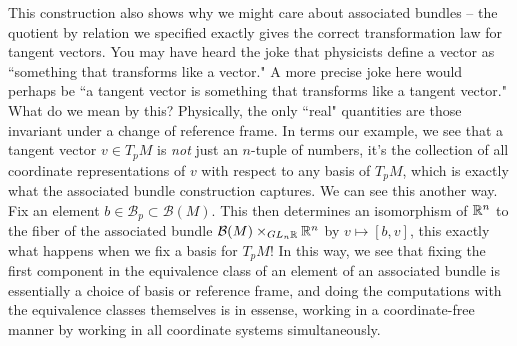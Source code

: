 \documentclass[abstract=on,twoside]{scrreprt}
\begin{document}
This construction also shows why we might care about associated bundles -- the quotient
by relation we specified exactly gives the correct transformation law for tangent
vectors. You may have heard the joke that physicists define a vector as ``something
that transforms like a vector." A more precise joke here would perhaps be ``a tangent
vector is something that transforms like a tangent vector." What do we mean by this?
Physically, the only ``real" quantities are those invariant under a change of reference
frame. In terms our example, we see that a tangent vector $v \in T_pM$ is
\emph{not} just an $n$-tuple of numbers, it's the collection of all coordinate
representations of $v$ with respect to any basis of $T_pM$, which is exactly what
the associated bundle construction captures. We can see this another way. Fix
an element $b \in \mathcal{B}_p \subset \mathcal{B}(M)$. This then determines an
isomorphism of $\mathbb{R}^n$ to the fiber of the associated bundle
$\mathcal{B}(M) \times_{GL_n\mathbb{R}} \mathbb{R}^n$ by $v \mapsto [b,v]$, this exactly what happens
when we fix a basis for $T_pM$! In this way, we see that fixing the first component
in the equivalence class of an element of an associated bundle is essentially a
choice of basis or reference frame, and doing the computations with the equivalence
classes themselves is in essense, working in a coordinate-free manner by working
in all coordinate systems simultaneously.\\
\end{document}
